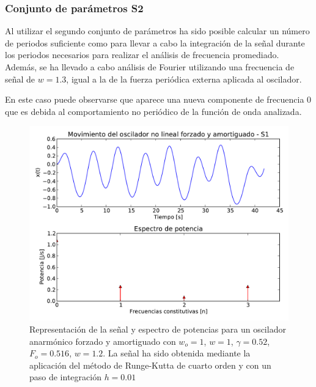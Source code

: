 \documentclass[11pt]{article}
\begin{document}
\subsubsection{Conjunto de parámetros S2}
Al utilizar el segundo conjunto de parámetros ha sido posible calcular un número de periodos suficiente como para llevar a cabo la integración de la señal durante los periodos necesarios para realizar el análisis de frecuencia promediado. Además, se ha llevado a cabo análisis de Fourier utilizando una frecuencia de señal de $w=1.3$, igual a la de la fuerza periódica externa aplicada al oscilador.

En este caso puede observarse que aparece una nueva componente de frecuencia 0 que es debida al comportamiento no periódico de la función de onda analizada.

\begin{figure}
\centering
\includegraphics[width=0.75\linewidth]{caso_anarmonico_s1.pdf}
\caption{Representación de la señal y espectro de potencias para un oscilador anarmónico forzado y amortiguado con $w_o = 1$, $w = 1$, $\gamma = 0.52$, $F_o = 0.516$, $w = 1.2$. La señal ha sido obtenida mediante la aplicación del método de Runge-Kutta de cuarto orden y con un paso de integración $h = 0.01$}
\label{fig:caso_anarmonico_s1}
\end{figure}
\end{document}
